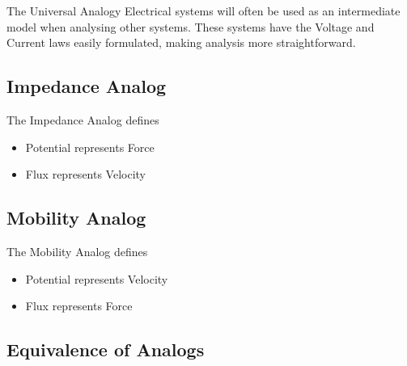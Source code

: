 \documentclass{../templates/topic}
\begin{document}
\begin{section}{The Universal Analogy}
	Electrical systems will often be used as an intermediate model when analysing other systems. These systems have the Voltage and Current laws easily formulated, making analysis more straightforward.
	
	\subsection{Impedance Analog}
		The Impedance Analog defines
		\begin{itemize}
			\item Potential represents Force
			\item Flux represents Velocity
		\end{itemize}
	
	\subsection{Mobility Analog}
		The Mobility Analog defines
		\begin{itemize}
			\item Potential represents Velocity
			\item Flux represents Force
		\end{itemize}
	\subsection{Equivalence of Analogs}
		
\end{section}
\end{document}
